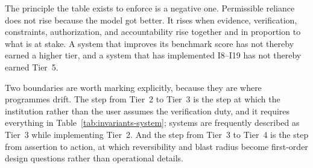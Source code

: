 The principle the table exists to enforce is a negative one. Permissible reliance
does not rise because the model got better. It rises when evidence, verification,
constraints, authorization, and accountability rise together and in proportion to
what is at stake. A system that improves its benchmark score has not thereby earned
a higher tier, and a system that has implemented I8--I19 has not thereby earned
Tier~5.

Two boundaries are worth marking explicitly, because they are where programmes
drift. The step from Tier~2 to Tier~3 is the step at which the institution rather
than the user assumes the verification duty, and it requires everything in
Table~\ref{tab:invariants-system}; systems are frequently described as Tier~3 while
implementing Tier~2. And the step from Tier~3 to Tier~4 is the step from assertion
to action, at which reversibility and blast radius become first-order design
questions rather than operational details.
